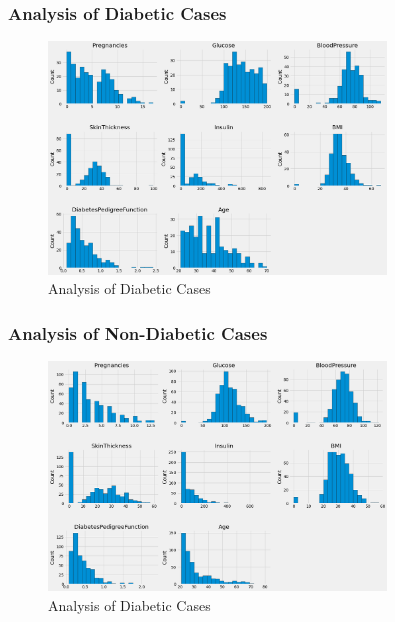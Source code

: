 \documentclass[11pt,en]{elegantpaper}
\begin{document}
\subsubsection{Analysis of Diabetic Cases}
\begin{figure}[H]
    \centering
    \includegraphics[width=0.8\textwidth]{figure/f2.png}
    \caption{Analysis of Diabetic Cases}
\end{figure}

\subsubsection{Analysis of Non-Diabetic Cases}
\begin{figure}[H]
    \centering
    \includegraphics[width=0.8\textwidth]{figure/f3.png}
    \caption{Analysis of Diabetic Cases}
\end{figure}
\end{document}
